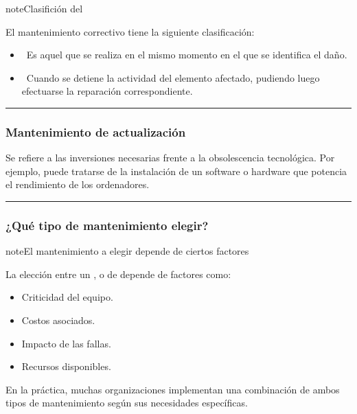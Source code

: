 \documentclass[letterpaper,10pt,spanish]{sphinxmanual}
\begin{document}
\begin{sphinxadmonition}{note}{Clasifición del }

\sphinxAtStartPar
El mantenimiento correctivo tiene la siguiente clasificación:
\begin{itemize}
\item {} 
\sphinxAtStartPar
{} Es aquel que se realiza en el mismo momento en el que se identifica el daño.

\item {} 
\sphinxAtStartPar
{} Cuando se detiene la actividad del elemento afectado, pudiendo luego efectuarse la reparación correspondiente.

\end{itemize}
\end{sphinxadmonition}


\bigskip\hrule\bigskip



\subsubsection{Mantenimiento de actualización}
\label{\detokenize{1_guias/10informatica/G1004:mantenimiento-de-actualizacion}}
\sphinxAtStartPar
Se refiere a las inversiones necesarias frente a la obsolescencia tecnológica. Por ejemplo, puede tratarse de la instalación de un software o hardware que potencia el rendimiento de los ordenadores.


\bigskip\hrule\bigskip



\subsubsection{¿Qué tipo de mantenimiento elegir?}
\label{\detokenize{1_guias/10informatica/G1004:que-tipo-de-mantenimiento-elegir}}
\begin{sphinxadmonition}{note}{El mantenimiento a elegir depende de ciertos factores}

\sphinxAtStartPar
La elección entre un ,  o de  depende de factores como:
\begin{itemize}
\item {} 
\sphinxAtStartPar
Criticidad del equipo.

\item {} 
\sphinxAtStartPar
Costos asociados.

\item {} 
\sphinxAtStartPar
Impacto de las fallas.

\item {} 
\sphinxAtStartPar
Recursos disponibles.

\end{itemize}

\sphinxAtStartPar
En la práctica, muchas organizaciones implementan una combinación de ambos tipos de mantenimiento según sus necesidades específicas.
\end{sphinxadmonition}
\end{document}
